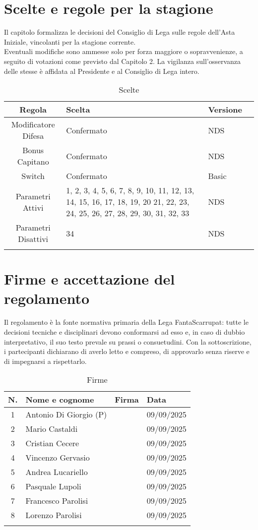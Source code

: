 \chapter{Scelte e regole per la stagione}
\label{scelte}

Il capitolo formalizza le decisioni del Consiglio di Lega sulle regole dell’Asta Iniziale, vincolanti per la stagione corrente. \\
Eventuali modifiche sono ammesse solo per forza maggiore o sopravvenienze, a seguito di votazioni come previsto dal Capitolo 2. La vigilanza sull’osservanza delle stesse è affidata al Presidente e al Consiglio di Lega intero. \\

\begin{longtable}{|c|p{4.5cm}|p{4.5cm}|p{2.8cm}|}
\hline
\textbf{Regola} & \textbf{Scelta} & \textbf{Versione}\\
\hline
Modificatore Difesa & Confermato & NDS \\
\hline
Bonus Capitano & Confermato & NDS \\
\hline
Switch & Confermato & Basic \\
\hline
Parametri Attivi & 1, 2, 3, 4, 5, 6, 7, 8, 9, 10, 11, 12, 13, 14, 15, 16, 17, 18, 19, 20
        21, 22, 23, 24, 25, 26, 27, 28, 29, 30, 31, 32, 33 & NDS \\
\hline
Parametri Disattivi & 34 & NDS \\
\hline
\caption{Scelte}
\end{longtable}


\chapter{Firme e accettazione del regolamento}
\label{cap:firme}

Il regolamento è la fonte normativa primaria della Lega FantaScarrupat: tutte le decisioni tecniche e disciplinari devono conformarsi ad esso e, in caso di dubbio interpretativo, il suo testo prevale su prassi o consuetudini. Con la sottoscrizione, i partecipanti dichiarano di averlo letto e compreso, di approvarlo senza riserve e di impegnarsi a rispettarlo. \\

\begin{longtable}{|c|p{4.5cm}|p{4.5cm}|p{2.8cm}|}
\hline
\textbf{N.} & \textbf{Nome e cognome} & \textbf{Firma} & \textbf{Data} \\
\hline
1 & Antonio Di Giorgio (P) & & 09/09/2025 \\
\hline
2 & Mario Castaldi & & 09/09/2025 \\
\hline
3 & Cristian Cecere & & 09/09/2025 \\
\hline
4 & Vincenzo Gervasio & & 09/09/2025 \\
\hline
5 & Andrea Lucariello & & 09/09/2025 \\
\hline
6 & Pasquale Lupoli & & 09/09/2025 \\
\hline
7 & Francesco Parolisi & & 09/09/2025 \\
\hline
8 & Lorenzo Parolisi & & 09/09/2025 \\
\hline
\caption{Firme}
\end{longtable}
